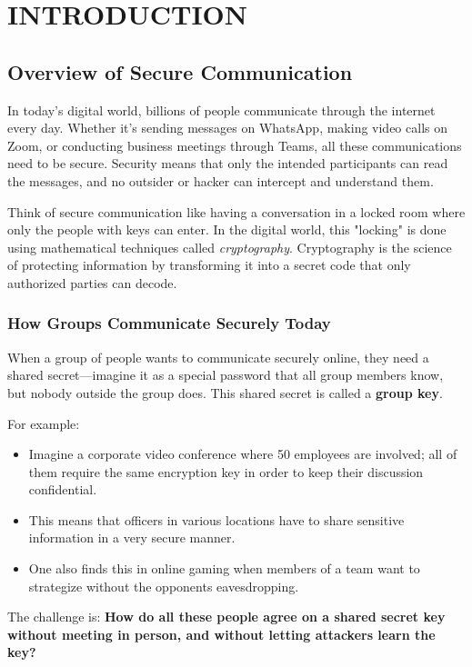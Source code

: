 \documentclass[12pt,a4paper]{report}
\begin{document}
\chapter{INTRODUCTION}

\section{Overview of Secure Communication}

In today's digital world, billions of people communicate through the internet every day. Whether it's sending messages on WhatsApp, making video calls on Zoom, or conducting business meetings through Teams, all these communications need to be secure. Security means that only the intended participants can read the messages, and no outsider or hacker can intercept and understand them.

Think of secure communication like having a conversation in a locked room where only the people with keys can enter. In the digital world, this "locking" is done using mathematical techniques called \textit{cryptography}. Cryptography is the science of protecting information by transforming it into a secret code that only authorized parties can decode.

\subsection{How Groups Communicate Securely Today}

When a group of people wants to communicate securely online, they need a shared secret—imagine it as a special password that all group members know, but nobody outside the group does. This shared secret is called a \textbf{group key}.

For example:
\begin{itemize}
\item Imagine a corporate video conference where 50 employees are involved; all of them require the same encryption key in order to keep their discussion confidential. 
\item This means that officers in various locations have to share sensitive information in a very secure manner.
\item One also finds this in online gaming when members of a team want to strategize without the opponents eavesdropping.
\end{itemize}

The challenge is: \textbf{How do all these people agree on a shared secret key without meeting in person, and without letting attackers learn the key?}
\end{document}
